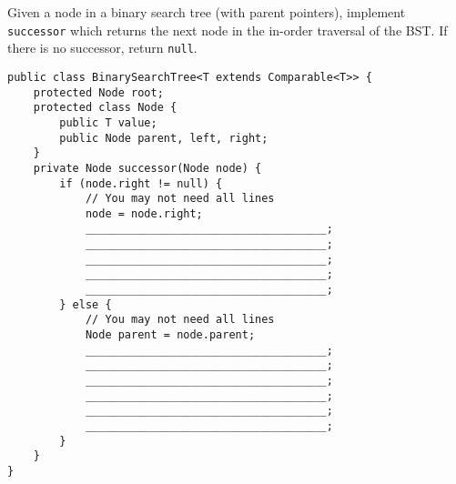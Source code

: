 \begin{blocksection}
\question Given a node in a binary search tree (with parent pointers),
implement \lstinline$successor$ which returns the next node in the in-order
traversal of the BST. If there is no successor, return \lstinline$null$.

\ifprintanswers\else
\begin{lstlisting}
public class BinarySearchTree<T extends Comparable<T>> {
    protected Node root;
    protected class Node {
        public T value;
        public Node parent, left, right;
    }
    private Node successor(Node node) {
        if (node.right != null) {
            // You may not need all lines
            node = node.right;
            _____________________________________;
            _____________________________________;
            _____________________________________;
            _____________________________________;
            _____________________________________;
        } else {
            // You may not need all lines
            Node parent = node.parent;
            _____________________________________;
            _____________________________________;
            _____________________________________;
            _____________________________________;
            _____________________________________;
            _____________________________________;
        }
    }
}
\end{lstlisting}
\fi
\end{blocksection}

